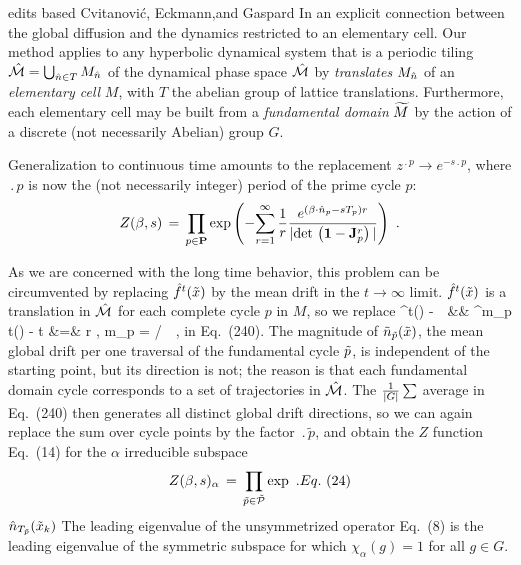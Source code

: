     {edits based Cvitanovi\'c,  Eckmann,and Gaspard}
In   an explicit
connection between the global diffusion and the dynamics restricted to
an elementary cell.
Our method applies to any  hyperbolic dynamical system that is
a periodic tiling $\hat {{\cal M}}=\bigcup_{ \hat{n} \in T} M_{
\hat{n}}$
of the dynamical phase space $\hat {{\cal M}}$ by {\sl translates}
$M_{\hat{n}}$
of an {\sl elementary cell} $M$, with $T$ the abelian group of lattice
translations.
Furthermore, each elementary cell may be built from a
{\sl fundamental domain}
${\widetilde M}$
by the action of a discrete (not necessarily Abelian) group $G$.

                                                            \toCB
Generalization to continuous time amounts to the replacement
$ z^{\period{p}} \rightarrow e^{-s \period{p}} $,
where $\period{p}$ is now the (not necessarily integer)
period of the prime cycle $p$:
$$
Z(\beta,s)\,=\,\prod_{p\in\PP} \exp \left( - {
 \sum_{r=1}^\infty {1 \over r}
 { e^{(\beta \cdot \hn_p- s \period{p}) r } %
 \over { | \det \left( {\bf 1}-{\bf J}_p^{r} \right) | } }
 } \right)
\,\, .
$$


 As we are concerned with the long time behavior,
 this problem can be circumvented
 by replacing $ \hat f^t(\tilde x{}) $ by the mean
 drift in the $t \rightarrow \infty$ limit.
 $ \hat f^t(\tilde x{}) $ is a translation in $\hat {{\cal M}}$ for each
 complete cycle $p$ in $M$, so we replace
 \bea
 \hf^t(\tx{\tpk}) - \tx{\tpk}
 \,\Longrightarrow \,
 &&
 { { \hf^{m_p t}(\tx{\tpk}) - \tx{\tpk} }
 }
 \continue
t &=& r , \quad m_p = / \quad \tx \in \tp \,\, ,
 \eea
 in Eq.~(240).
 The magnitude of ${\tilde n}_{{\tilde p}}(\tilde x{})$, the mean
 global drift per one traversal of the fundamental cycle ${\tilde p}$, is
 independent of the starting point, but its direction is not; the
 reason is that each fundamental domain cycle corresponds to a set of
 trajectories in $\hat {{\cal M}}$.
 The ${1 \over {|G|}} \sum$ average in
 Eq.~(240) then generates all distinct global drift
 directions, so we can again replace the
 sum over cycle points by the factor $\period{\tilde{p}}$, and obtain the
 $Z$ function Eq.~(14) for the $\alpha $ irreducible subspace
 $$
 Z(\beta,s)_\alpha\,=\,\prod_{{\tilde p} \in \tilde{\cal{P}} } \exp
 \,\, .
 Eq.~(24)
 $$
 $\hat{n}_{{T_{\tilde{p}}}}(\tilde x_k)$
 The leading eigenvalue of the
unsymmetrized
 operator Eq.~(8) is
 the leading eigenvalue of the symmetric subspace for which
 $\chi_\alpha(g)=1$ for all $g \in G$.


